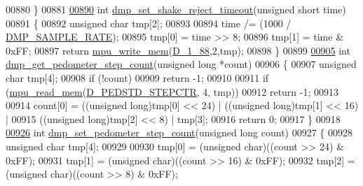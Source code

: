 \begin{DoxyCode}
00880 \}
00881 
\hypertarget{inv__mpu__dmp__motion__driver_8c_source.tex_l00890}{}\hyperlink{group___d_r_i_v_e_r_s_ga5d44d1a32535000e6902cdc5224d1b54}{00890} \textcolor{keywordtype}{int} \hyperlink{group___d_r_i_v_e_r_s_ga5d44d1a32535000e6902cdc5224d1b54}{dmp\_set\_shake\_reject\_timeout}(\textcolor{keywordtype}{unsigned} \textcolor{keywordtype}{short} time)
00891 \{
00892     \textcolor{keywordtype}{unsigned} \textcolor{keywordtype}{char} tmp[2];
00893 
00894     time /= (1000 / \hyperlink{group___d_r_i_v_e_r_s_ga9d0f0425cbcb58186500cb8686e41e67}{DMP\_SAMPLE\_RATE});
00895     tmp[0] = time >> 8;
00896     tmp[1] = time & 0xFF;
00897     \textcolor{keywordflow}{return} \hyperlink{group___d_r_i_v_e_r_s_gafea59910bc3dd30ba3356b1c75213a5f}{mpu\_write\_mem}(\hyperlink{group___d_r_i_v_e_r_s_ga05bc14cf9653fc7778acfa75c9ac19df}{D\_1\_88},2,tmp);
00898 \}
00899 
\hypertarget{inv__mpu__dmp__motion__driver_8c_source.tex_l00905}{}\hyperlink{group___d_r_i_v_e_r_s_gad8f4d1a93e0f03d950559501c5a7255b}{00905} \textcolor{keywordtype}{int} \hyperlink{group___d_r_i_v_e_r_s_gad8f4d1a93e0f03d950559501c5a7255b}{dmp\_get\_pedometer\_step\_count}(\textcolor{keywordtype}{unsigned} \textcolor{keywordtype}{long} *count)
00906 \{
00907     \textcolor{keywordtype}{unsigned} \textcolor{keywordtype}{char} tmp[4];
00908     \textcolor{keywordflow}{if} (!count)
00909         \textcolor{keywordflow}{return} -1;
00910 
00911     \textcolor{keywordflow}{if} (\hyperlink{group___d_r_i_v_e_r_s_ga3374bececb6743893c9eab27645c1182}{mpu\_read\_mem}(\hyperlink{group___d_r_i_v_e_r_s_ga4925c8f2bfe6e2698c10bf5b1094dc54}{D\_PEDSTD\_STEPCTR}, 4, tmp))
00912         \textcolor{keywordflow}{return} -1;
00913 
00914     count[0] = ((\textcolor{keywordtype}{unsigned} long)tmp[0] << 24) | ((\textcolor{keywordtype}{unsigned} long)tmp[1] << 16) |
00915         ((\textcolor{keywordtype}{unsigned} long)tmp[2] << 8) | tmp[3];
00916     \textcolor{keywordflow}{return} 0;
00917 \}
00918 
\hypertarget{inv__mpu__dmp__motion__driver_8c_source.tex_l00926}{}\hyperlink{group___d_r_i_v_e_r_s_ga568562c19998f585b1d2ba056cd209db}{00926} \textcolor{keywordtype}{int} \hyperlink{group___d_r_i_v_e_r_s_ga568562c19998f585b1d2ba056cd209db}{dmp\_set\_pedometer\_step\_count}(\textcolor{keywordtype}{unsigned} \textcolor{keywordtype}{long} count)
00927 \{
00928     \textcolor{keywordtype}{unsigned} \textcolor{keywordtype}{char} tmp[4];
00929 
00930     tmp[0] = (\textcolor{keywordtype}{unsigned} char)((count >> 24) & 0xFF);
00931     tmp[1] = (\textcolor{keywordtype}{unsigned} char)((count >> 16) & 0xFF);
00932     tmp[2] = (\textcolor{keywordtype}{unsigned} char)((count >> 8) & 0xFF);

\end{DoxyCode}
